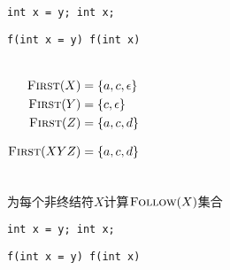\begin{frame}{}
  \begin{center}

    \vspace{0.30cm}
    \texttt{int x = y; \qquad int x;}

    \vspace{0.20cm}
    \texttt{f(int x = y) \qquad f(int x)}
  \end{center}
\end{frame}

\begin{frame}{}
  \begin{columns}
      
      \pause
      \begin{align*}
        \textsc{First}(X) &= \{a, c, \epsilon\} \\
        \textsc{First}(Y) &= \{c, \epsilon\} \\
        \textsc{First}(Z) &= \{a, c, d\} \\[8pt]
        \textsc{First}(XYZ) &= \{a, c, d\}
      \end{align*}
  \end{columns}
\end{frame}

\begin{frame}{}
  \begin{center}
    {\large 为每个非终结符$X$计算$\textsc{Follow}(X)$集合}

    

    \pause
  \end{center}
\end{frame}

\begin{frame}{}
  \begin{center}

    \vspace{0.30cm}
    \texttt{int x = y; \qquad int x;}

    \vspace{0.20cm}
    \texttt{f(int x = y) \qquad f(int x)}
  \end{center}
\end{frame}

